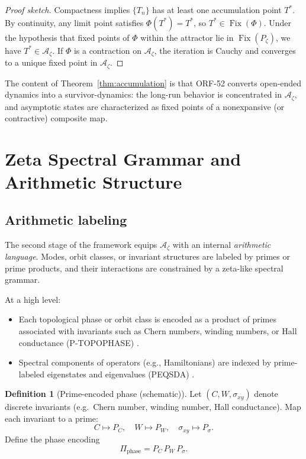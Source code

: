 \documentclass[11pt]{article}
\theoremstyle{definition}
\newtheorem{definition}{Definition}[section]
\theoremstyle{plain}
\theoremstyle{remark}
\newcommand{\Azet}{\mathcal{A}_\zeta}
\begin{document}
\begin{proof}[Proof sketch]
Compactness implies $\{T_n\}$ has at least one accumulation point $T^*$. By continuity, any limit point satisfies $\Phi(T^*)=T^*$, so $T^*\in\operatorname{Fix}(\Phi)$. Under the hypothesis that fixed points of $\Phi$ within the attractor lie in $\operatorname{Fix}(P_\zeta)$, we have $T^*\in\Azet$. If $\Phi$ is a contraction on $\Azet$, the iteration is Cauchy and converges to a unique fixed point in $\Azet$.
\end{proof}

The content of Theorem~\ref{thm:accumulation} is that ORF-52 converts open-ended dynamics into a survivor-dynamics: the long-run behavior is concentrated in $\Azet$, and asymptotic states are characterized as fixed points of a nonexpansive (or contractive) composite map.

\section{Zeta Spectral Grammar and Arithmetic Structure}

\subsection{Arithmetic labeling}

The second stage of the framework equips $\Azet$ with an internal \emph{arithmetic language}. Modes, orbit classes, or invariant structures are labeled by primes or prime products, and their interactions are constrained by a zeta-like spectral grammar.

At a high level:
\begin{itemize}
  \item Each topological phase or orbit class is encoded as a product of primes associated with invariants such as Chern numbers, winding numbers, or Hall conductance (P-TOPOPHASE) \cite[file:330]{P-TOPOPHASE.pdf}.
  \item Spectral components of operators (e.g., Hamiltonians) are indexed by prime-labeled eigenstates and eigenvalues (PEQSDA) \cite[file:335]{P-SPECTRALDECOMP.pdf}.
\end{itemize}

\begin{definition}[Prime-encoded phase (schematic)]
Let $(C,W,\sigma_{xy})$ denote discrete invariants (e.g.\ Chern number, winding number, Hall conductance). Map each invariant to a prime:
\[
C \mapsto P_C,\quad W \mapsto P_W,\quad \sigma_{xy} \mapsto P_{\sigma}.
\]
Define the phase encoding
\[
\Pi_{\text{phase}} = P_C \, P_W \, P_{\sigma}.
\]
\end{definition}
\end{document}
